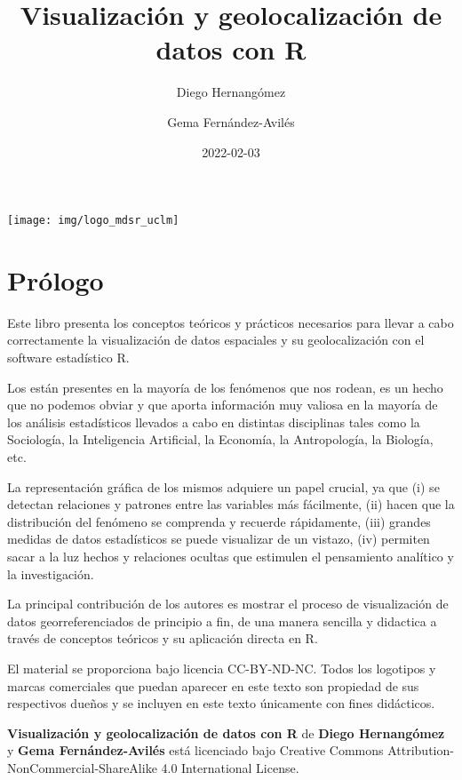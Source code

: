 \documentclass[
]{book}
\title{Visualización y geolocalización de datos con R}
\author{Diego Hernangómez \and Gema Fernández-Avilés}
\date{2022-02-03}
\theoremstyle{definition}
\theoremstyle{definition}
\theoremstyle{definition}
\theoremstyle{definition}
\theoremstyle{remark}
\begin{document}
\maketitle

{
\setcounter{tocdepth}{1}
\tableofcontents
}
\begin{center}\texttt{[image: img/logo\_mdsr\_uclm]} \end{center}

\hypertarget{pruxf3logo}{%
\chapter*{Prólogo}\label{pruxf3logo}}

Este libro presenta los conceptos teóricos y prácticos necesarios para llevar a
cabo correctamente la visualización de datos espaciales y su geolocalización
con el software estadístico R.

Los  están presentes en la mayoría de los fenómenos
que nos rodean, es un hecho que no podemos obviar y que aporta información muy
valiosa en la mayoría de los análisis estadísticos llevados a cabo en distintas
disciplinas tales como la Sociología, la Inteligencia Artificial, la Economía,
la Antropología, la Biología, etc.

La representación gráfica de los mismos adquiere un papel crucial, ya que (i) se
detectan relaciones y patrones entre las variables más fácilmente, (ii) hacen
que la distribución del fenómeno se comprenda y recuerde rápidamente, (iii)
grandes medidas de datos estadísticos se puede visualizar de un vistazo, (iv)
permiten sacar a la luz hechos y relaciones ocultas que estimulen el pensamiento
analítico y la investigación.

La principal contribución de los autores es mostrar el proceso de visualización de
datos georreferenciados de principio a fin, de una manera sencilla y didactica
a través de conceptos teóricos y su aplicación directa en R.

El material se proporciona bajo licencia CC-BY-ND-NC.
Todos los logotipos y marcas comerciales que puedan aparecer en este texto
son propiedad de sus respectivos dueños y se incluyen en este texto únicamente
con fines didácticos.

\textbf{Visualización y geolocalización de datos con R} de \textbf{Diego Hernangómez} y
\textbf{Gema Fernández-Avilés} está licenciado bajo
Creative Commons Attribution-NonCommercial-ShareAlike 4.0 International License.
\end{document}
